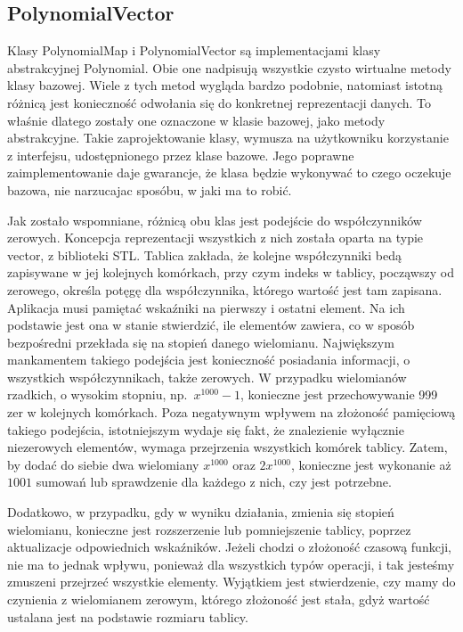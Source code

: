 \subsection{PolynomialVector}

Klasy PolynomialMap i PolynomialVector są implementacjami klasy abstrakcyjnej Polynomial. Obie one nadpisują wszystkie czysto wirtualne metody klasy bazowej. Wiele z tych metod wygląda bardzo podobnie, natomiast istotną różnicą jest konieczność odwołania się do konkretnej reprezentacji danych. To właśnie dlatego zostały one oznaczone w klasie bazowej, jako metody abstrakcyjne. Takie zaprojektowanie klasy, wymusza na użytkowniku korzystanie z interfejsu, udostępnionego przez klase bazowe. Jego poprawne zaimplementowanie daje gwarancje, że klasa będzie wykonywać to czego oczekuje bazowa, nie narzucajac sposóbu, w jaki ma to robić.

Jak zostało wspomniane, różnicą obu klas jest podejście do współczynników zerowych. Koncepcja reprezentacji wszystkich z nich została oparta na typie vector, z biblioteki STL. Tablica zakłada, że kolejne współczynniki bedą zapisywane w jej kolejnych komórkach, przy czym indeks w tablicy, począwszy od zerowego, określa potęgę dla współczynnika, którego wartość jest tam zapisana. Aplikacja musi pamiętać wskaźniki na pierwszy i ostatni element. Na ich podstawie jest ona w stanie stwierdzić, ile elementów zawiera, co w sposób bezpośredni przekłada się na stopień danego wielomianu. Największym mankamentem takiego podejścia jest konieczność posiadania informacji, o wszystkich współczynnikach, także zerowych. W przypadku wielomianów rzadkich, o wysokim stopniu, np.\ $x^{1000}-1$, konieczne jest przechowywanie 999 zer w kolejnych komórkach. Poza negatywnym wpływem na złożoność pamięciową takiego podejścia, istotniejszym wydaje się fakt, że znalezienie wyłącznie niezerowych elementów, wymaga przejrzenia wszystkich komórek tablicy. Zatem, by dodać do siebie dwa wielomiany $x^{1000}$ oraz $2x^{1000}$, konieczne jest wykonanie aż $1001$ sumowań lub sprawdzenie dla każdego z nich, czy jest potrzebne.

Dodatkowo, w przypadku, gdy w wyniku działania, zmienia się stopień wielomianu, konieczne jest rozszerzenie lub pomniejszenie tablicy, poprzez aktualizacje odpowiednich wskaźników. Jeżeli chodzi o złożoność czasową funkcji, nie ma to jednak wpływu, ponieważ dla wszystkich typów operacji, i tak jesteśmy zmuszeni przejrzeć wszystkie elementy. Wyjątkiem jest stwierdzenie, czy mamy do czynienia z wielomianem zerowym, którego złożoność jest stała, gdyż wartość ustalana jest na podstawie rozmiaru tablicy.

